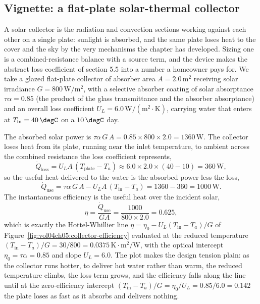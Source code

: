 \subsection{Vignette: a flat-plate solar-thermal collector}

A solar collector is the radiation and convection sections working against
each other on a single plate: sunlight is absorbed, and the same plate
loses heat to the cover and the sky by the very mechanisms the chapter has
developed. Sizing one is a combined-resistance balance with a source term,
and the device makes the abstract loss coefficient of section 5.5 into a
number a homeowner pays for. We take a glazed flat-plate collector of
absorber area $A = 2.0\,\text{m}^2$ receiving solar irradiance $G =
800\,\text{W}/\text{m}^2$, with a selective absorber coating of solar
absorptance $\tau\alpha = 0.85$ (the product of the glass transmittance
and the absorber absorptance) and an overall loss coefficient $U_L =
6.0\,\text{W}/(\text{m}^2\cdot\si{\kelvin})$, carrying water that enters at
$T_{\text{in}} = 40\,\degC$ on a $10\,\degC$ day.

The absorbed solar power is $\tau\alpha\,G\,A = 0.85\times800\times2.0 =
1360\,\text{W}$. The collector loses heat from its plate, running near the
inlet temperature, to ambient across the combined resistance the loss
coefficient represents,
\[
\dot{Q}_{\text{loss}} = U_L A\,(T_{\text{plate}} - T_a) \approx 6.0\times
2.0\times(40 - 10) = 360\,\text{W},
\]
so the useful heat delivered to the water is the absorbed power less the
loss,
\[
\dot{Q}_{\text{use}} = \tau\alpha\,G\,A - U_L A\,(T_{\text{in}} - T_a) =
1360 - 360 = 1000\,\text{W}.
\]
The instantaneous efficiency is the useful heat over the incident solar,
\[
\eta = \frac{\dot{Q}_{\text{use}}}{G A} = \frac{1000}{800\times2.0} =
0.625,
\]
which is exactly the Hottel-Whillier line $\eta = \eta_0 - U_L
(T_{\text{in}} - T_a)/G$ of Figure~\ref{fig:vol04ch05:collector-efficiency}
evaluated at the reduced temperature $(T_{\text{in}} - T_a)/G = 30/800 =
0.0375\,\si{\kelvin}\cdot\text{m}^2/\text{W}$, with the optical intercept
$\eta_0 = \tau\alpha = 0.85$ and slope $U_L = 6.0$. The plot makes the
design tension plain: as the collector runs hotter, to deliver hot water
rather than warm, the reduced temperature climbs, the loss term grows, and
the efficiency falls along the line until at the zero-efficiency intercept
$(T_{\text{in}} - T_a)/G = \eta_0/U_L = 0.85/6.0 = 0.142$ the plate loses
as fast as it absorbs and delivers nothing.



